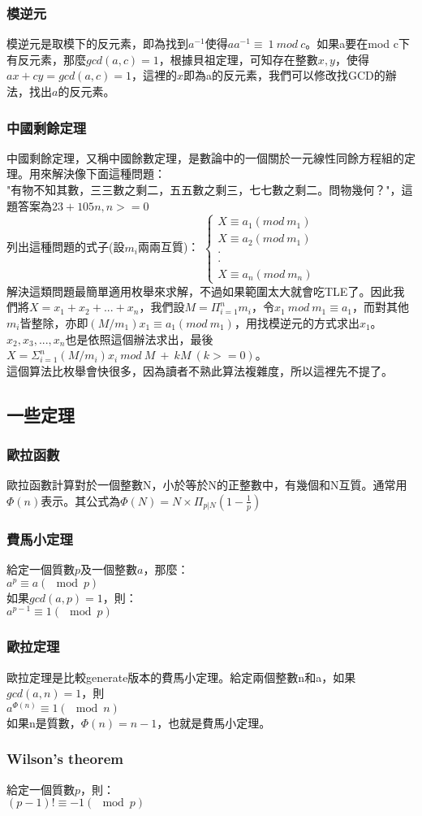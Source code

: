 \subsubsection{模逆元}
模逆元是取模下的反元素，即為找到$a^{-1}$使得$aa^{-1}\equiv\ 1\ mod\ c$。如果a要在mod c下有反元素，那麼$gcd(a,c)=1$，根據貝祖定理，可知存在整數$x,y$，使得$ax+cy=gcd(a,c)=1$，這裡的$x$即為a的反元素，我們可以修改找GCD的辦法，找出$a$的反元素。

\subsubsection{中國剩餘定理}
中國剩餘定理，又稱中國餘數定理，是數論中的一個關於一元線性同餘方程組的定理。用來解決像下面這種問題：\\
"有物不知其數，三三數之剩二，五五數之剩三，七七數之剩二。問物幾何？"，這題答案為$23+105n,n>=0$\\
列出這種問題的式子(設$m_i$兩兩互質)：
$\left \{ \begin{matrix} X\equiv a_1 (mod\ m_1)\\ X\equiv a_2 (mod\ m_1)\\ \cdot \\ \cdot \\ X\equiv a_n (mod\ m_n)\end{matrix}\right.$\\
解決這類問題最簡單適用枚舉來求解，不過如果範圍太大就會吃TLE了。因此我們將$X=x_1+x_2+...+x_n$，我們設$M=\Pi_{i=1}^{n} m_i$，令$x_1\ mod\ m_1\equiv a_1$，而對其他$m_i$皆整除，亦即$(M/m_1)x_1\equiv a_1 (mod\ m_1)$，用找模逆元的方式求出$x_1$。$x_2,x_3,...,x_n$也是依照這個辦法求出，最後$X=\Sigma_{i=1}^{n} (M/m_i)x_i\ mod\ M\ +\ kM\ (k>=0)$。\\
這個算法比枚舉會快很多，因為讀者不熟此算法複雜度，所以這裡先不提了。

\subsection{一些定理}
\subsubsection{歐拉函數}
歐拉函數計算對於一個整數N，小於等於N的正整數中，有幾個和N互質。通常用$\Phi(n)$表示。其公式為$\Phi(N)=N\times\Pi_{p|N}(1-\frac{1}{p})$

\subsubsection{費馬小定理}
給定一個質數$p$及一個整數$a$，那麼：\\
$a^p \equiv a (\mod p)$\\
如果$gcd(a,p)=1$，則：\\
$a^{p-1} \equiv 1 (\mod p)$\\
\subsubsection{歐拉定理}
歐拉定理是比較generate版本的費馬小定理。給定兩個整數n和a，如果$gcd(a,n)=1$，則\\
$a^{\Phi(n)} \equiv 1 (\mod n)$\\
如果n是質數，$\Phi(n)=n-1$，也就是費馬小定理。
\subsubsection{Wilson's theorem}
給定一個質數$p$，則：\\
$(p-1)!\equiv -1 (\mod p)$
